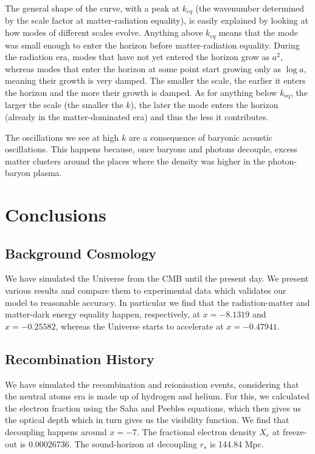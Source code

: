 \documentclass{aa}
\begin{document}
The general shape of the curve, with a peak at $k_{eq}$ (the wavenumber determined by the scale factor at matter-radiation equality), is easily explained by looking at how modes of different scales evolve. Anything above $k_{eq}$ means that the mode was small enough to enter the horizon before matter-radiation equality. During the radiation era, modes that have not yet entered the horizon grow as $a^2$, whereas modes that enter the horizon at some point start growing only as $\log a$, meaning their growth is very damped. The smaller the scale, the earlier it enters the horizon and the more their growth is damped. As for anything below $k_\text{eq}$, the larger the scale (the smaller the $k$), the later the mode enters the horizon (already in the matter-dominated era) and thus the less it contributes.

The oscillations we see at high $k$ are a consequence of baryonic acoustic oscillations. This happens because, once baryons and photons decouple, excess matter clusters around the places where the density was higher in the photon-baryon plasma.

\section{Conclusions}

\subsection{Background Cosmology}
We have simulated the Universe from the CMB until the present day. We present various results and compare them to experimental data which validates our model to reasonable accuracy. In particular we find that the radiation-matter and matter-dark energy equality happen, respectively, at $x = -8.1319$ and $x = -0.25582$, whereas the Universe starts to accelerate at $x=-0.47941$.

\subsection{Recombination History}

We have simulated the recombination and reionisation events, considering that the neutral atoms era is made up of hydrogen and helium. For this, we calculated the electron fraction using the Saha and Peebles equations, which then gives us the optical depth which in turn gives us the visibility function. We find that decoupling happens around $x=-7$. The fractional electron density $X_e$ at freeze-out is 0.00026736. The sound-horizon at decoupling $r_s$ is 144.84 Mpc.
\end{document}
